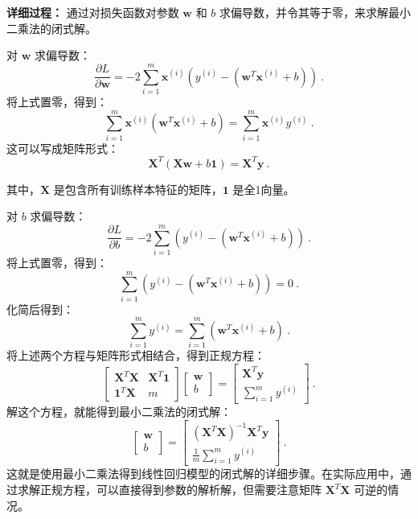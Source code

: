 \begin{example}{\textbf{详细过程：}
通过对损失函数对参数 $\mathbf{w}$ 和 $b$ 求偏导数，并令其等于零，来求解最小二乘法的闭式解。}

对 $\mathbf{w}$ 求偏导数：
\begin{equation}
\frac{\partial L}{\partial \mathbf{w}} = -2 \sum_{i=1}^{m} \mathbf{x}^{(i)} (y^{(i)} - (\mathbf{w}^T \mathbf{x}^{(i)} + b))~.
\end{equation}
将上式置零，得到：
\begin{equation}
\sum_{i=1}^{m} \mathbf{x}^{(i)} (\mathbf{w}^T \mathbf{x}^{(i)} + b) = \sum_{i=1}^{m} \mathbf{x}^{(i)} y^{(i)}~.
\end{equation}
这可以写成矩阵形式：
\begin{equation}
\mathbf{X}^T (\mathbf{X} \mathbf{w} + b\mathbf{1}) = \mathbf{X}^T \mathbf{y}~.
\end{equation}

其中，$\mathbf{X}$ 是包含所有训练样本特征的矩阵，$\mathbf{1}$ 是全1向量。

对 $b$ 求偏导数：
\begin{equation}
\frac{\partial L}{\partial b} = -2 \sum_{i=1}^{m} (y^{(i)} - (\mathbf{w}^T \mathbf{x}^{(i)} + b))~.
\end{equation}
将上式置零，得到：
\begin{equation}
\sum_{i=1}^{m} (y^{(i)} - (\mathbf{w}^T \mathbf{x}^{(i)} + b)) = 0~.
\end{equation}
化简后得到：
\begin{equation}
\sum_{i=1}^{m} y^{(i)} = \sum_{i=1}^{m} (\mathbf{w}^T \mathbf{x}^{(i)} + b)~.
\end{equation}
将上述两个方程与矩阵形式相结合，得到正规方程：
\begin{equation}
\begin{bmatrix}
    \mathbf{X}^T \mathbf{X} & \mathbf{X}^T \mathbf{1} \\
    \mathbf{1}^T \mathbf{X} & m
\end{bmatrix}
\begin{bmatrix}
    \mathbf{w} \\
    b
\end{bmatrix}
=
\begin{bmatrix}
    \mathbf{X}^T \mathbf{y} \\
    \sum_{i=1}^{m} y^{(i)}
\end{bmatrix}~.
\end{equation}
解这个方程，就能得到最小二乘法的闭式解：
\begin{equation}
\begin{bmatrix}
    \mathbf{w} \\
    b
\end{bmatrix}
=
\begin{bmatrix}
    (\mathbf{X}^T \mathbf{X})^{-1} \mathbf{X}^T \mathbf{y} \\
    \frac{1}{m} \sum_{i=1}^{m} y^{(i)}
\end{bmatrix}~.
\end{equation}
这就是使用最小二乘法得到线性回归模型的闭式解的详细步骤。在实际应用中，通过求解正规方程，可以直接得到参数的解析解，但需要注意矩阵 $\mathbf{X}^T \mathbf{X}$ 可逆的情况。
\end{example}

